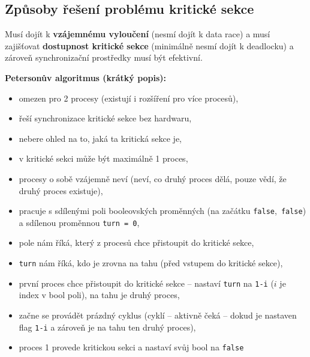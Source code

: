 \documentclass[a4paper, 11pt]{article}
\newcommand{\tfalse}{\texttt{false}}
\begin{document}
\subsection{Způsoby řešení problému kritické sekce}
Musí dojít k \textbf{vzájemnému vyloučení} (nesmí dojít k data race) a musí zajišťovat \textbf{dostupnost kritické sekce} (minimálně nesmí dojít k deadlocku) a zároveň synchronizační prostředky musí být efektivní.
 
\textbf{Petersonův algoritmus (krátký popis):}
\begin{itemize}
    \item omezen pro 2 procesy (existují i rozšíření pro více procesů),
    \item řeší synchronizace kritické sekce bez hardwaru,
    \item nebere ohled na to, jaká ta kritická sekce je,
    \item v kritické sekci může být maximálně 1 proces,
    \item procesy o sobě vzájemně neví (neví, co druhý proces dělá, pouze vědí, že druhý proces existuje),
    \item pracuje s sdílenými poli booleovských proměnných (na začátku \tfalse,\ \tfalse) a sdílenou proměnnou \texttt{turn = 0},
    \item pole nám říká, který z procesů chce přistoupit do kritické sekce,
    \item \texttt{turn} nám říká, kdo je zrovna na tahu (před vstupem do kritické sekce),
    \item první proces chce přistoupit do kritické sekce -- nastaví \texttt{turn} na \texttt{1-i} ($i$ je index v bool poli), na tahu je druhý proces,
    \item začne se provádět prázdný cyklus (cyklí -- aktivně čeká -- dokud je nastaven flag \texttt{1-i} a zároveň je na tahu ten druhý proces),
    \item proces 1 provede kritickou sekci a nastaví svůj bool na \tfalse
\end{itemize}
\end{document}
